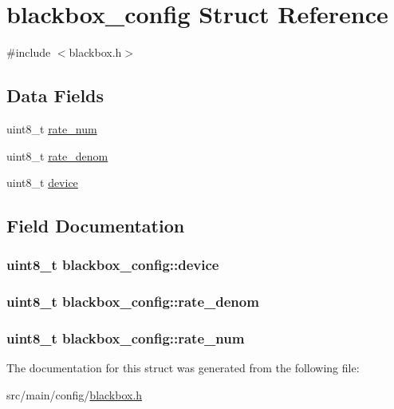 \hypertarget{structblackbox__config}{\section{blackbox\+\_\+config Struct Reference}
\label{structblackbox__config}
}


{\ttfamily \#include $<$blackbox.\+h$>$}

\subsection*{Data Fields}
\begin{DoxyCompactItemize}
\item 
uint8\+\_\+t \hyperlink{structblackbox__config_ad8cdec054ff38e13944c7a8ac558ae0f}{rate\+\_\+num}
\item 
uint8\+\_\+t \hyperlink{structblackbox__config_a30510177b93da4cc7cea6914301de62c}{rate\+\_\+denom}
\item 
uint8\+\_\+t \hyperlink{structblackbox__config_abd2c773a11ff0a8de3b460185145566c}{device}
\end{DoxyCompactItemize}


\subsection{Field Documentation}
\hypertarget{structblackbox__config_abd2c773a11ff0a8de3b460185145566c}{
\subsubsection[{device}]{\setlength{\rightskip}{0pt plus 5cm}uint8\+\_\+t blackbox\+\_\+config\+::device}}\label{structblackbox__config_abd2c773a11ff0a8de3b460185145566c}
\hypertarget{structblackbox__config_a30510177b93da4cc7cea6914301de62c}{
\subsubsection[{rate\+\_\+denom}]{\setlength{\rightskip}{0pt plus 5cm}uint8\+\_\+t blackbox\+\_\+config\+::rate\+\_\+denom}}\label{structblackbox__config_a30510177b93da4cc7cea6914301de62c}
\hypertarget{structblackbox__config_ad8cdec054ff38e13944c7a8ac558ae0f}{
\subsubsection[{rate\+\_\+num}]{\setlength{\rightskip}{0pt plus 5cm}uint8\+\_\+t blackbox\+\_\+config\+::rate\+\_\+num}}\label{structblackbox__config_ad8cdec054ff38e13944c7a8ac558ae0f}


The documentation for this struct was generated from the following file\+:\begin{DoxyCompactItemize}
\item 
src/main/config/\hyperlink{config_2blackbox_8h}{blackbox.\+h}\end{DoxyCompactItemize}
